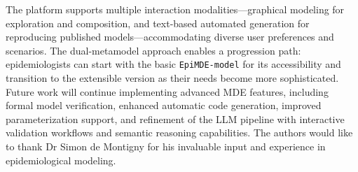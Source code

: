 \documentclass[pdflatex,sn-mathphys-num]{sn-jnl}%
\theoremstyle{thmstyleone}%
\theoremstyle{thmstyletwo}%
\theoremstyle{thmstylethree}%
\begin{document}
The platform supports multiple interaction modalities—graphical modeling for exploration and composition, and text-based automated generation for reproducing published models—accommodating diverse user preferences and scenarios. The dual-metamodel approach enables a progression path: epidemiologists can start with the basic \texttt{EpiMDE-model} for its accessibility and transition to the extensible version as their needs become more sophisticated. Future work will continue implementing advanced MDE features, including formal model verification, enhanced automatic code generation, improved parameterization support, and refinement of the LLM pipeline with interactive validation workflows and semantic reasoning capabilities.
\label{sec:conclusion}
The authors would like to thank Dr Simon de Montigny for his invaluable input and experience in epidemiological modeling. 




\appendix

\end{document}
